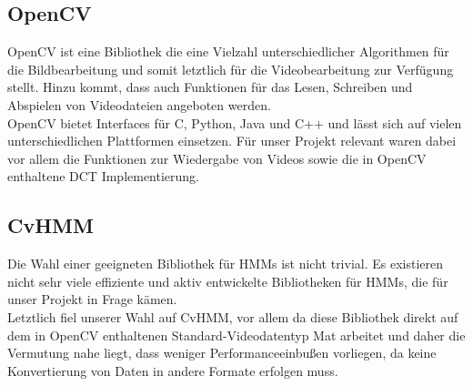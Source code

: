 \subsection{OpenCV}
\label{sec:opencv}
OpenCV ist eine Bibliothek die eine Vielzahl unterschiedlicher Algorithmen für die Bildbearbeitung und somit letztlich für die Videobearbeitung zur Verfügung stellt.
 Hinzu kommt, dass auch Funktionen für das Lesen, Schreiben und Abspielen von Videodateien angeboten werden.\\

OpenCV bietet Interfaces für C, Python, Java und C++ und lässt sich auf vielen unterschiedlichen Plattformen einsetzen.
 Für unser Projekt relevant waren dabei vor allem die Funktionen zur Wiedergabe von Videos sowie die in OpenCV enthaltene DCT Implementierung.


\subsection{CvHMM}
\label{sec:cvhmm}
Die Wahl einer geeigneten Bibliothek für HMMs ist nicht trivial.
 Es existieren nicht sehr viele effiziente und aktiv entwickelte Bibliotheken für HMMs, die für unser Projekt in Frage kämen.\\

Letztlich fiel unserer Wahl auf CvHMM, vor allem da diese Bibliothek direkt auf dem in OpenCV enthaltenen Standard-Videodatentyp Mat arbeitet und daher die Vermutung nahe liegt, dass weniger Performanceeinbußen vorliegen, da keine Konvertierung von Daten in andere Formate erfolgen muss.\\


